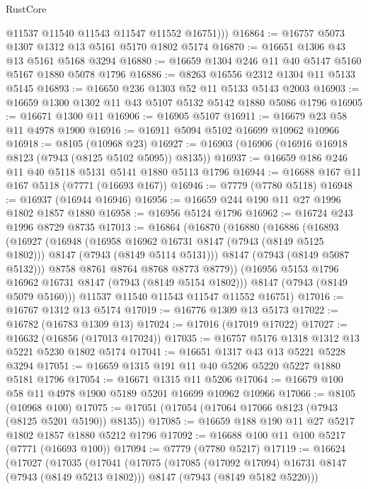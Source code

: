 \begin{lexlean}{RustCore}
\begin{coremodule}
          @11537
          @11540
          @11543
          @11547
          @11552
          @16751)))
@16864 := @16757 @5073 @1307 @1312 @13 @5161 @5170 @1802 @5174
@16870 := @16651 @1306 @43 @13 @5161 @5168 @3294
@16880 := @16659 @1304 @246 @11 @40 @5147 @5160 @5167 @1880 @5078 @1796
@16886 := @8263 @16556 @2312 @1304 @11 @5133 @5145
@16893 := @16650 @236 @1303 @52 @11 @5133 @5143 @2003
@16903 := @16659 @1300 @1302 @11 @43 @5107 @5132 @5142 @1880 @5086 @1796
@16905 := @16671 @1300 @11
@16906 := @16905 @5107
@16911 := @16679 @23 @58 @11 @4978 @1900
@16916 := @16911 @5094 @5102 @16699 @10962 @10966
@16918 := @8105 (@10968 @23)
@16927 := @16903 (@16906 (@16916 @16918 @8123 (@7943 (@8125 @5102 @5095)) @8135))
@16937 := @16659 @186 @246 @11 @40 @5118 @5131 @5141 @1880 @5113 @1796
@16944 := @16688 @167 @11 @167 @5118 (@7771 (@16693 @167))
@16946 := @7779 (@7780 @5118)
@16948 := @16937 (@16944 @16946)
@16956 := @16659 @244 @190 @11 @27 @1996 @1802 @1857 @1880
@16958 := @16956 @5124 @1796
@16962 := @16724 @243 @1996 @8729 @8735
@17013 := @16864
    (@16870
      (@16880
        (@16886
          (@16893
            (@16927
              (@16948
                (@16958 @16962 @16731 @8147 (@7943 (@8149 @5125 @1802)))
                @8147
                (@7943 (@8149 @5114 @5131)))
              @8147
              (@7943 (@8149 @5087 @5132)))
            @8758
            @8761
            @8764
            @8768
            @8773
            @8779))
        (@16956 @5153 @1796 @16962 @16731 @8147 (@7943 (@8149 @5154 @1802)))
        @8147
        (@7943 (@8149 @5079 @5160)))
      @11537
      @11540
      @11543
      @11547
      @11552
      @16751)
@17016 := @16767 @1312 @13 @5174
@17019 := @16776 @1309 @13 @5173
@17022 := @16782 (@16783 @1309 @13)
@17024 := @17016 (@17019 @17022)
@17027 := @16632 (@16856 (@17013 @17024))
@17035 := @16757 @5176 @1318 @1312 @13 @5221 @5230 @1802 @5174
@17041 := @16651 @1317 @43 @13 @5221 @5228 @3294
@17051 := @16659 @1315 @191 @11 @40 @5206 @5220 @5227 @1880 @5181 @1796
@17054 := @16671 @1315 @11 @5206
@17064 := @16679 @100 @58 @11 @4978 @1900 @5189 @5201 @16699 @10962 @10966
@17066 := @8105 (@10968 @100)
@17075 := @17051 (@17054 (@17064 @17066 @8123 (@7943 (@8125 @5201 @5190)) @8135))
@17085 := @16659 @188 @190 @11 @27 @5217 @1802 @1857 @1880 @5212 @1796
@17092 := @16688 @100 @11 @100 @5217 (@7771 (@16693 @100))
@17094 := @7779 (@7780 @5217)
@17119 := @16624
    (@17027
      (@17035
        (@17041
          (@17075
            (@17085 (@17092 @17094) @16731 @8147 (@7943 (@8149 @5213 @1802)))
            @8147
            (@7943 (@8149 @5182 @5220)))

\end{coremodule}
\end{lexlean}
